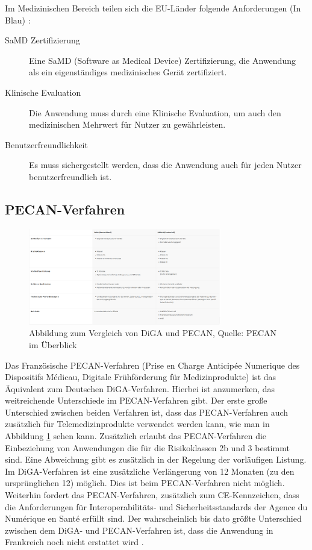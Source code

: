\documentclass{article}
\begin{document}
		Im Medizinischen Bereich teilen sich die EU-Länder folgende Anforderungen (In Blau) \cite[vgl. How to get your DTx approved and reimbursed in the EU]{dtx-regulatory-frameworks}:
		\begin{description}
			\item[SaMD Zertifizierung] Eine SaMD (Software as Medical Device) Zertifizierung, die Anwendung als ein eigenständiges medizinisches Gerät zertifiziert.
			\item[Klinische Evaluation] Die Anwendung muss durch eine Klinische Evaluation, um auch den medizinischen Mehrwert für Nutzer zu gewährleisten.
			\item[Benutzerfreundlichkeit] Es muss sichergestellt werden, dass die Anwendung auch für jeden Nutzer benutzerfreundlich ist.
		\end{description}
		\newpage  
		\subsection{PECAN-Verfahren}
			\begin{figure}[htbp]
				\centering
				\includegraphics[width=0.75\textwidth]{./grafiken/abbildung-diga-versus-pecan}
				\caption[DiGA vs. PECAN]{Abbildung zum Vergleich von DiGA und PECAN, Quelle: PECAN im Überblick \cite{PECAN-Verfahren}}
				\label{Abb-diga-vs-pecan}
			\end{figure}
			Das Französische PECAN-Verfahren (Prise en Charge Anticipée Numerique des Dispositifs Médicau, Digitale Frühförderung für Medizinprodukte) ist das Äquivalent zum Deutschen DiGA-Verfahren. Hierbei ist anzumerken, das weitreichende Unterschiede im PECAN-Verfahren gibt. Der erste große Unterschied zwischen beiden Verfahren ist, dass das PECAN-Verfahren auch zusätzlich für Telemedizinprodukte verwendet werden kann, wie man in Abbildung \ref{Abb-diga-vs-pecan} sehen kann. Zusätzlich erlaubt das PECAN-Verfahren die Einbeziehung von Anwendungen die für die Risikoklassen 2b und 3 bestimmt sind. Eine Abweichung gibt es zusätzlich in der Regelung der vorläufigen Listung. Im DiGA-Verfahren ist eine zusätzliche Verlängerung von 12 Monaten (zu den ursprünglichen 12) möglich. Dies ist beim PECAN-Verfahren nicht möglich. Weiterhin fordert das PECAN-Verfahren, zusätzlich zum CE-Kennzeichen, dass die Anforderungen für Interoperabilitäts- und Sicherheitsstandards der Agence du Numérique en Santé erfüllt sind. Der wahrscheinlich bis dato größte Unterschied zwischen dem DiGA- und PECAN-Verfahren ist, dass die Anwendung in Frankreich noch nicht erstattet wird \cite[vgl. DiGA vs. PECAN]{PECAN-Verfahren}.
\end{document}

